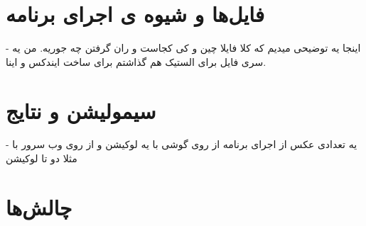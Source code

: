 \section{فایل‌ها و شیوه ‌ی اجرای برنامه}
- اینجا یه توضیحی میدیم که کلا فایلا چین و کی کجاست و ران گرفتن چه جوریه. من یه سری فایل برای الستیک هم گذاشتم برای ساخت ایندکس و اینا. 

\section{سیمولیشن و نتایج}
- یه تعدادی عکس از اجرای برنامه از روی گوشی با یه لوکیشن و از روی وب سرور با مثلا دو تا لوکیشن


\section{چالش‌ها}